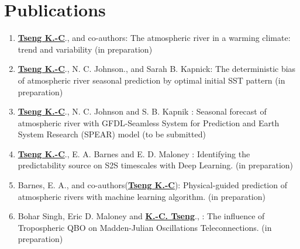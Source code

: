 \documentclass{article}
\begin{document}
\section{\color{airforceblue}Publications}
\begin{enumerate}
	\item \normalsize{\bf{\underline{Tseng K.-C}}}., and co-authors: The atmospheric river in a warming climate: trend and variability (in preparation)
	\item \normalsize{\bf{\underline{Tseng K.-C}}}., N. C. Johnson., and Sarah B. Kapnick: The deterministic bias of atmospheric river seasonal prediction by optimal initial SST pattern (in preparation)
    \item \normalsize{\bf{\underline{Tseng K.-C}}}., N. C. Johnson and S. B. Kapnik : Seasonal forecast of atmospheric river with GFDL-Seamless System for Prediction and Earth System Research (SPEAR) model (to be submitted)\par
    \item \normalsize{\bf{\underline{Tseng K.-C}}}., E. A. Barnes and E. D. Maloney : Identifying the predictability source on S2S timescales with Deep Learning. (in preparation)  \par	
	\item Barnes, E. A., and co-authors(\normalsize{\bf{\underline{Tseng K.-C}}}): Physical-guided prediction of atmospheric rivers with machine learning algorithm. (in preparation)  \par
	\item Bohar Singh, Eric D. Maloney and \normalsize{\bf{\underline{K.-C. Tseng}}}., : The influence of Tropospheric QBO on Madden-Julian Oscillations Teleconnections. (in preparation)  \par


\end{enumerate}
\end{document}
